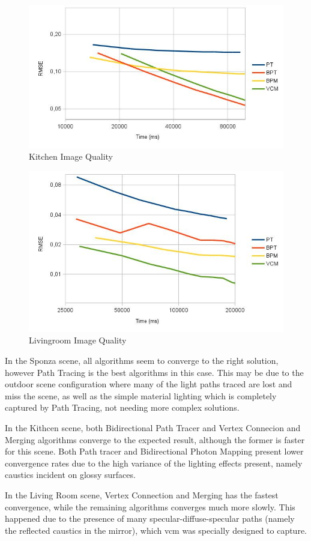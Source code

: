 \begin{figure}[H]
\centering
\includegraphics[width=0.8\linewidth]{img/kitchenImgq.jpg}
\caption{\label{img:kitchenImgq} Kitchen Image Quality}
\end{figure}

\begin{figure}[H]
\centering
\includegraphics[width=0.8\linewidth]{img/livingroomImgq.jpg}
\caption{\label{img:livingroomImgq} Livingroom Image Quality}
\end{figure}

In the Sponza scene, all algorithms seem to converge to the right solution, however Path Tracing is the best algorithms in this case. This may be due to the outdoor scene configuration where many of the light paths traced are lost and miss the scene, as well as the simple material lighting which is completely captured by Path Tracing, not needing more complex solutions.

In the Kithcen scene, both Bidirectional Path Tracer and Vertex Connecion and Merging algorithms converge to the expected result, although the former is faster for this scene. Both Path tracer and Bidirectional Photon Mapping present lower convergence rates due to the high variance of the lighting effects present, namely caustics incident on glossy surfaces.

In the Living Room scene, Vertex Connection and Merging has the fastest convergence, while the remaining algorithms converges much more slowly. This happened due to the presence of many specular-diffuse-specular paths (namely the reflected caustics in the mirror), which \gls{vcm} was specially designed to capture.